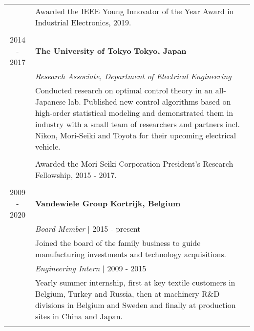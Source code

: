 \documentclass[a4paper,10pt]{article}
\begin{document}
\begin{tabularx}{\textwidth}{cX}
& Awarded the IEEE Young Innovator of the Year Award in Industrial Electronics, 2019. \\
& \\
2014 - 2017 & \textbf{The University of Tokyo} \hfill \textbf{Tokyo, Japan} \\
& \textit{Research Associate, Department of Electrical Engineering} \\
& Conducted research on optimal control theory in an all-Japanese lab. Published new control algorithms 
based on high-order statistical modeling and demonstrated them in industry with %
a small team of researchers and partners incl. Nikon, Mori-Seiki 
and Toyota for their upcoming electrical vehicle. \\
& \\
& Awarded the Mori-Seiki Corporation President's Research Fellowship, 2015 - 2017. \\
& \\
2009 - 2020 & \textbf{Vandewiele Group} \hfill \textbf{Kortrijk, Belgium} \\
& \textit{Board Member} | 2015 - present \\
& Joined the board of the family business to guide manufacturing investments and technology acquisitions. \\
& \textit{Engineering Intern} | 2009 - 2015 \\
& Yearly summer internship, first at key textile customers in Belgium, Turkey and Russia, then at 
machinery R\&D divisions in Belgium and Sweden and finally at production sites in China and Japan. \\
& \\
\end{tabularx}
\end{document}
